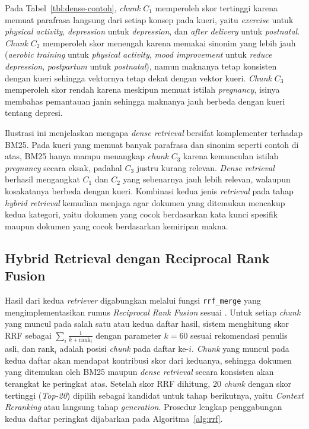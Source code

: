 Pada Tabel~\ref{tbl:dense-contoh}, \textit{chunk} $C_1$ memperoleh skor tertinggi karena memuat parafrasa langsung dari setiap konsep pada kueri, yaitu \textit{exercise} untuk \textit{physical activity}, \textit{depression} untuk \textit{depression}, dan \textit{after delivery} untuk \textit{postnatal}. \textit{Chunk} $C_2$ memperoleh skor menengah karena memakai sinonim yang lebih jauh (\textit{aerobic training} untuk \textit{physical activity}, \textit{mood improvement} untuk \textit{reduce depression}, \textit{postpartum} untuk \textit{postnatal}), namun maknanya tetap konsisten dengan kueri sehingga vektornya tetap dekat dengan vektor kueri. \textit{Chunk} $C_3$ memperoleh skor rendah karena meskipun memuat istilah \textit{pregnancy}, isinya membahas pemantauan janin sehingga maknanya jauh berbeda dengan kueri tentang depresi.

Ilustrasi ini menjelaskan mengapa \textit{dense retrieval} bersifat komplementer terhadap BM25. Pada kueri yang memuat banyak parafrasa dan sinonim seperti contoh di atas, BM25 hanya mampu menangkap \textit{chunk} $C_3$ karena kemunculan istilah \textit{pregnancy} secara eksak, padahal $C_3$ justru kurang relevan. \textit{Dense retrieval} berhasil mengangkat $C_1$ dan $C_2$ yang sebenarnya jauh lebih relevan, walaupun kosakatanya berbeda dengan kueri. Kombinasi kedua jenis \textit{retrieval} pada tahap \textit{hybrid retrieval} kemudian menjaga agar dokumen yang ditemukan mencakup kedua kategori, yaitu dokumen yang cocok berdasarkan kata kunci spesifik maupun dokumen yang cocok berdasarkan kemiripan makna.

\subsection{Hybrid Retrieval dengan Reciprocal Rank Fusion}
\label{subsec:impl-hybrid-rrf}

Hasil dari kedua \textit{retriever} digabungkan melalui fungsi \texttt{rrf\_merge} yang mengimplementasikan rumus \textit{Reciprocal Rank Fusion} sesuai \parencite{cormack2009reciprocal}. Untuk setiap \textit{chunk} yang muncul pada salah satu atau kedua daftar hasil, sistem menghitung skor RRF sebagai $\sum_{i} \frac{1}{k + \text{rank}_i}$ dengan parameter $k = 60$ sesuai rekomendasi penulis asli, dan $\text{rank}_i$ adalah posisi \textit{chunk} pada daftar ke-$i$. \textit{Chunk} yang muncul pada kedua daftar akan mendapat kontribusi skor dari keduanya, sehingga dokumen yang ditemukan oleh BM25 maupun \textit{dense retrieval} secara konsisten akan terangkat ke peringkat atas. Setelah skor RRF dihitung, 20 \textit{chunk} dengan skor tertinggi (\textit{Top-20}) dipilih sebagai kandidat untuk tahap berikutnya, yaitu \textit{Context Reranking} atau langsung tahap \textit{generation}. Prosedur lengkap penggabungan kedua daftar peringkat dijabarkan pada Algoritma~\ref{alg:rrf}.

